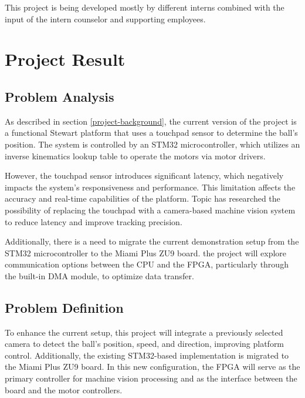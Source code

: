 \documentclass{article}
\begin{document}
This project is being developed mostly by different interns combined with the input of the intern counselor and supporting employees.


\newpage
\section{Project Result}


\subsection{Problem Analysis} As described in section \ref{project-background},
the current version of the project is a functional Stewart platform that uses a
touchpad sensor to determine the ball's position. The system is controlled by an
STM32 microcontroller, which utilizes an inverse kinematics lookup table to
operate the motors via motor drivers.

However, the touchpad sensor introduces significant latency, which negatively
impacts the system’s responsiveness and performance. This limitation affects the
accuracy and real-time capabilities of the platform. Topic has researched the
possibility of replacing the touchpad with a camera-based machine vision system
to reduce latency and improve tracking precision.

Additionally, there is a need to migrate the current demonstration setup from
the STM32 microcontroller to the Miami Plus ZU9 board.
the project will explore communication options between the CPU and the FPGA,
particularly through the built-in DMA module, to optimize data transfer.

\subsection{Problem Definition} 
To enhance the current setup, this project will
integrate a previously selected camera to detect the ball's position, speed, and
direction, improving platform control. Additionally, the existing STM32-based
implementation is migrated to the Miami Plus ZU9 board. In this new
configuration, the FPGA will serve as the primary controller for machine vision
processing and as the interface between the board and the motor controllers.
\end{document}
